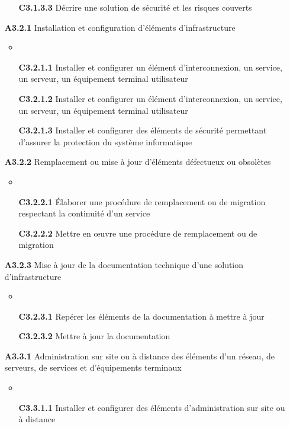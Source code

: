\documentclass[12pt,a4paper,oneside,titlepage,final]{article}
\begin{document}
\begin{enumerate}
\begin{itemize}
    \item [\textbf{C3.1.3.3}] Décrire une solution de sécurité et les
    risques couverts
  \end{itemize}
  \item [\textbf{A3.2.1}] Installation et configuration d'éléments
  d'infrastructure
  \begin{itemize}
    \item \item [\textbf{C3.2.1.1}] Installer et configurer un élément
    d'interconnexion, un service, un serveur, un équipement terminal
    utilisateur
    \item [\textbf{C3.2.1.2}] Installer et configurer un élément
    d'interconnexion, un service, un serveur, un équipement terminal
    utilisateur
    \item [\textbf{C3.2.1.3}] Installer et configurer des éléments de
    sécurité permettant d'assurer la protection du système
    informatique
  \end{itemize}
  \item [\textbf{A3.2.2}] Remplacement ou mise à jour d'éléments
  défectueux ou obsolètes
  \begin{itemize}
    \item \item [\textbf{C3.2.2.1}] Élaborer une procédure de
    remplacement ou de migration respectant la continuité d'un service
    \item [\textbf{C3.2.2.2}] Mettre en œuvre une procédure de
    remplacement ou de migration
  \end{itemize}
  \item [\textbf{A3.2.3}] Mise à jour de la documentation technique
  d'une solution d'infrastructure
  \begin{itemize}
    \item \item [\textbf{C3.2.3.1}] Repérer les éléments de la
    documentation à mettre à jour
    \item [\textbf{C3.2.3.2}] Mettre à jour la documentation
  \end{itemize}
  \item [\textbf{A3.3.1}] Administration sur site ou à distance des
  éléments d'un réseau, de serveurs, de services et d'équipements
  terminaux
  \begin{itemize}
    \item \item [\textbf{C3.3.1.1}] Installer et configurer des
    éléments d'administration sur site ou à distance

\end{itemize}
\end{enumerate}
\end{document}
